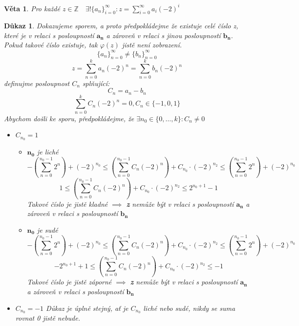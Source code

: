 \documentclass[12pt]{book}
\newtheorem{veta}{Věta}
\newtheorem*{dukaz}{Důkaz}
\begin{document}
\begin{veta}
	Pro každé $z\in\mathbb{Z}\quad\exists!\{a_n\}_{i=0}^\infty:z=\sum_{i=0}^{\infty}a_i(-2)^i$
\end{veta}
\begin{dukaz}
	Dokazujeme sporem, a proto předpokládejme že existuje celé číslo z, které je v relaci s posloupností $\mathbf{a_n}$ a zároveň v relaci s jinou posloupností $\mathbf{b_n}$. Pokud takové číslo existuje, tak $\varphi(z)$ jistě není zobrazení.
	$$\{a_n\}_{n=0}^\infty \ne \{b_n\}_{n=0}^\infty$$ $$z=\sum_{n=0}^{k}a_n(-2)^n = \sum_{n=0}^{k}b_n(-2)^n$$
	definujme posloupnost $C_n$ splňující: $$C_n = a_n - b_n$$
	$$\sum_{n=0}^k C_n(-2)^n = 0 , C_n \in \{-1, 0 ,1\}$$
	Abychom došli ke sporu, předpokládejme, že $\exists n_0 \in \{0,\dots,k\}: C_n \ne 0$
	\begin{itemize}
		\item[$\alpha)$]$C_{n_0} = 1$
		      \begin{itemize}
			      \item[I.)] $\mathbf{n_0}$ je liché
			            $$-\left(\sum_{n=0}^{n_0-1}2^n\right)+(-2)^{n_0}\leq \left(\sum_{n=0}^{n_0-1}C_n(-2)^n\right)+C_{n_0}\cdot(-2)^{n_2}  \leq\left(\sum_{n=0}^{n_0-1}2^n\right)+(-2)^{n_0}$$
			            $$1\leq \left(\sum_{n=0}^{n_0-1}C_n(-2)^n\right)+C_{n_0}\cdot(-2)^{n_2}  \leq 2^{n_0 + 1}-1$$
			            Takové číslo je jistě kladné $\implies$ \textbf{z} nemůže být v relaci s posloupností $\mathbf{a_n}$ a zároveň v relaci s posloupností $\mathbf{b_n}$
			      \item[II.)]  $\mathbf{n_0}$ je sudé
			            $$-\left(\sum_{n=0}^{n_0-1}2^n\right)+(-2)^{n_0}\leq \left(\sum_{n=0}^{n_0-1}C_n(-2)^n\right)+C_{n_0}\cdot(-2)^{n_2}  \leq\left(\sum_{n=0}^{n_0-1}2^n\right)+(-2)^{n_0}$$
			            $$-2^{n_0+1}+1\leq \left(\sum_{n=0}^{n_0-1}C_n(-2)^n\right)+C_{n_0}\cdot(-2)^{n_2}  \leq -1$$
			            Takové číslo je jistě záporné $\implies$ \textbf{z} nemůže být v relaci s posloupností $\mathbf{a_n}$ a zároveň v relaci s posloupností $\mathbf{b_n}$
			            
		      \end{itemize}
		\item[$\beta)$]$C_{n_0} = -1$\newline
		      Důkaz je úplně stejný, ať je $C_{n_0}$ liché nebo sudé, nikdy se suma rovnat 0 jistě nebude.
	\end{itemize}
	
\end{dukaz}
\end{document}
